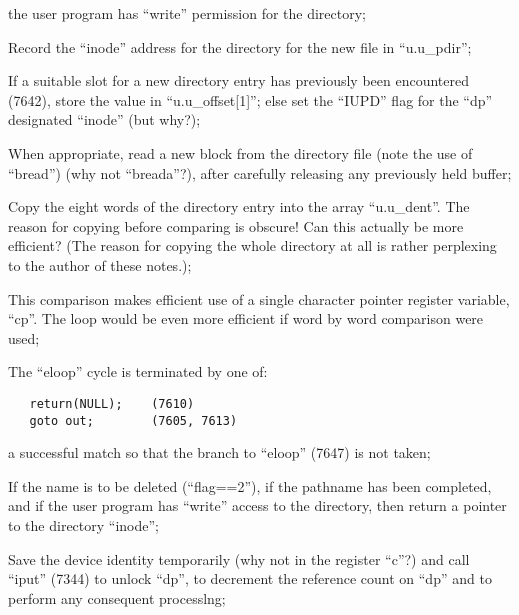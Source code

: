       \item[(c)] the user program has ``write''
      permission for the directory;
\ed

\item[7606:] Record the ``inode'' address for
      the directory for the new file in
      ``u.u\_pdir'';

\item[7607:] If a suitable slot for a new
      directory entry has previously
      been encountered (7642), store
      the value in ``u.u\_offset[1]'';
      else set the ``IUPD'' flag for the
      ``dp'' designated ``inode'' (but why?);

\item[7622:] When appropriate, read a new
      block from the directory file
      (note the use of ``bread'') (why
      not ``breada''?), after carefully
      releasing any previously held
      buffer;

\item[7636:] Copy the eight words of the
      directory entry into the array
      ``u.u\_dent''. The reason for copying before comparing is obscure!
      Can this actually be more efficient? (The reason for copying
      the whole directory at all is
      rather perplexing to the author
      of these notes.);

\item[7645:] This comparison makes efficient
      use of a single character pointer
      register variable, ``cp''. The
      loop would be even more efficient
      if word by word comparison were
      used;

\item[7647:] The ``eloop'' cycle is terminated
      by one of:

\begin{verbatim}
   return(NULL);    (7610)
   goto out;        (7605, 7613)
\end{verbatim}

\noindent a successful match  so  that  the
branch  to  ``eloop'' (7647) is not
taken;

\item [7657:] If the  name  is  to  be  deleted
(``flag==2''),  if the pathname has
been completed, and if  the  user
program has ``write'' access to the
directory, then return a  pointer
to the directory ``inode'';

\item[7662:] Save  the  device  identity  temporarily (why not in the register
``c''?) and call ``iput''  (7344)  to
unlock  ``dp'',  to  decrement  the
reference count on  ``dp''  and  to
perform  any  consequent processlng;


